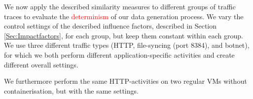 \documentclass[sigconf]{acmart}
\begin{document}


We now apply the described similarity measures to different groups of traffic traces to evaluate the \textcolor{red}{determinism} of our data generation process. We vary the control settings of the described influence factors, described in Section \ref{Sec:Impactfactors}, for each group, but keep them constant within each group. We use three different traffic types (HTTP, file-syncing (port 8384), and botnet), for which we both perform different application-specific activities and create different overall settings. 

We furthermore perform the same HTTP-activities on two regular VMs without containerisation, but with the same settings.
\end{document}
